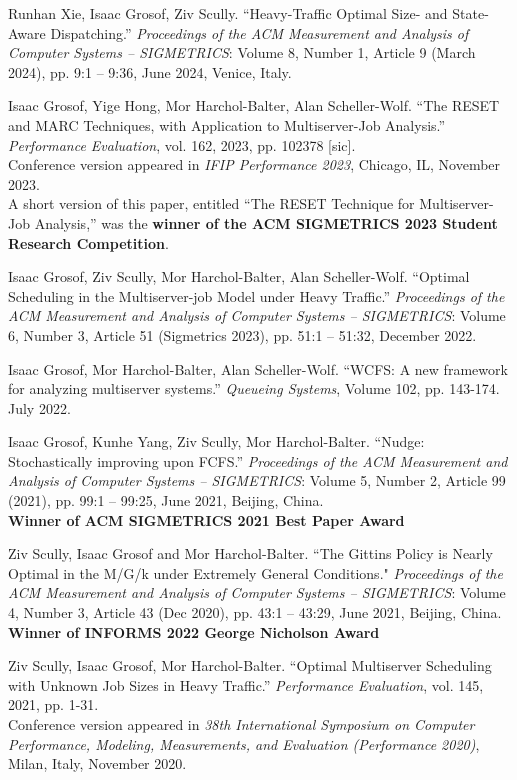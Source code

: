 \documentclass{res}
\begin{document}
\begin{resume}
    Runhan Xie, Isaac Grosof, Ziv Scully.
    ``Heavy-Traffic Optimal Size- and State-Aware Dispatching.''
    \textit{Proceedings of the ACM Measurement and Analysis of Computer Systems -- SIGMETRICS}: Volume 8, Number 1, Article 9 (March 2024), pp. 9:1 -- 9:36, June 2024, Venice, Italy.

    Isaac Grosof, Yige Hong, Mor Harchol-Balter, Alan Scheller-Wolf.
    ``The RESET and MARC Techniques, with Application to Multiserver-Job Analysis.''
    \textit{Performance Evaluation}, vol. 162, 2023, pp. 102378 [sic].\\
    Conference version appeared in  \textit{IFIP Performance 2023}, Chicago, IL, November 2023. \\
    A short version of this paper, entitled ``The RESET Technique for Multiserver-Job Analysis,''
    was the \textbf{winner of the ACM SIGMETRICS 2023 Student Research Competition}.

    Isaac Grosof, Ziv Scully, Mor Harchol-Balter, Alan Scheller-Wolf.
    ``Optimal Scheduling in the Multiserver-job Model under Heavy Traffic.''
     \textit{Proceedings of the ACM Measurement and Analysis of Computer Systems -- SIGMETRICS}:
     Volume 6, Number 3, Article 51 (Sigmetrics 2023),
     pp. 51:1 -- 51:32, December 2022.

    Isaac Grosof, Mor Harchol-Balter, Alan Scheller-Wolf.
    ``WCFS: A new framework for analyzing multiserver systems.''
    \textit{Queueing Systems}, Volume 102, pp. 143-174. July 2022.

    Isaac Grosof, Kunhe Yang, Ziv Scully, Mor Harchol-Balter.
    ``Nudge: Stochastically improving upon FCFS.''
    \textit{Proceedings of the ACM Measurement and Analysis of Computer Systems -- SIGMETRICS}: Volume 5, Number 2, Article 99 (2021), pp. 99:1 -- 99:25, June 2021, Beijing, China.\\
    \textbf{Winner of ACM SIGMETRICS 2021 Best Paper Award}

    Ziv Scully, Isaac Grosof and Mor Harchol-Balter.
    ``The Gittins Policy is Nearly Optimal in the M/G/k under Extremely General Conditions."
    \textit{Proceedings of the ACM Measurement and Analysis of Computer Systems -- SIGMETRICS}: Volume 4, Number 3, Article 43 (Dec 2020), pp. 43:1 -- 43:29, June 2021, Beijing, China. \\
    \textbf{Winner of INFORMS 2022 George Nicholson Award}

    Ziv Scully, Isaac Grosof, Mor Harchol-Balter.
    ``Optimal Multiserver Scheduling with Unknown Job Sizes in Heavy Traffic.''
    \textit{Performance Evaluation}, vol. 145, 2021, pp. 1-31. \\
    Conference version appeared in
    \textit{38th International Symposium on Computer Performance, Modeling, Measurements, and Evaluation (Performance 2020)},
    Milan, Italy, November 2020.


\end{resume}
\end{document}
